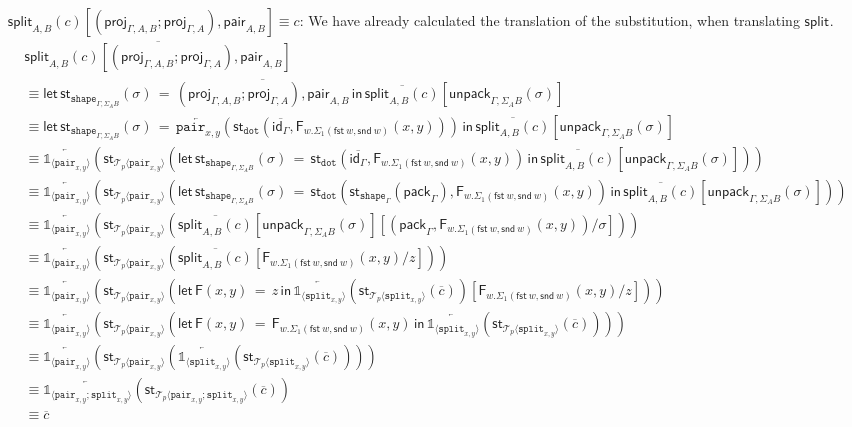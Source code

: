 \documentclass[10pt]{article}
\theoremstyle{definition}
\newcommand\dsd[1]{\ensuremath{\mathsf{#1}}}
\newcommand{\app}[2]{\ensuremath{#1 \: #2}}
\newcommand{\fst}[1]{\app{\dsd{fst}}{#1}}
\newcommand{\snd}[1]{\app{\dsd{snd}}{#1}}
\newcommand{\id}{\mathsf{id}}
\newcommand{\rewrite}[2]{\overleftarrow{#1}(#2)}
\newcommand\StI[2]{\ensuremath{\mathsf{st}_{#1}(#2)}}
\newcommand\StE[4]{\ensuremath{\mathsf{let} \, \StI{#1}{#3} \, = \, {#2} \, \mathsf{in} \, #4}}
\newcommand\FE[3]{\ensuremath{\mathsf{let} \, \mathsf{F}(#2) \, = \, {#1} \, \mathsf{in} \, #3}}
\newcommand\FIs[2]{\ensuremath{\mathsf{F}_{#1}{(#2)}}}
\newcommand\ApEl[2]{\mathcal{T}_{#1}\langle#2\rangle}
\newcommand\pack[1]{\ensuremath{\mathsf{pack}_{#1}}}
\newcommand\unpack[2]{\ensuremath{\mathsf{unpack}_{#1}(#2)}}
\newcommand{\tdot}{\ensuremath{\mathtt{dot}}}
\newcommand{\tshape}[1]{\ensuremath{\mathtt{shape}_{#1}}}
\newcommand{\upstairs}[1]{\overline{#1}}
\newcommand\proj[1]{\ensuremath{\mathsf{proj}_{#1}}}
\newcommand\One{\ensuremath{\mathds{1}}}
\newcommand\ApOne[1]{\ensuremath{\One_{\langle {#1} \rangle }}}
\newcommand\pair[1]{\ensuremath{\mathtt{pair}_{#1}}}
\newcommand\tsplit[1]{\ensuremath{\mathtt{split}_{#1}}}
\newcommand\qpair[1]{\ensuremath{\mathsf{pair}_{#1}}}
\newcommand\qsplit[1]{\ensuremath{\mathsf{split}_{#1}}}
\begin{document}
\begin{enumerate}[style = multiline, labelwidth = 80pt]
\item[{$\qsplit{A,B}(c)\allowbreak[(\proj{\Gamma, A, B};\proj{\Gamma, A}), \allowbreak\qpair{A,B}] \equiv c$}:] 
We have already calculated the translation of the substitution, when translating $\qsplit{}$.
\begin{align*}
&\upstairs{\qsplit{A,B}(c)[(\proj{\Gamma, A, B};\proj{\Gamma, A}), \qpair{A,B}]} \\
&\equiv \StE{\tshape{\Gamma, \Sigma_A B}}{\upstairs{(\proj{\Gamma, A, B};\proj{\Gamma, A}), \qpair{A,B}}}{\sigma}{\upstairs{\qsplit{A,B}(c)}[\unpack{\Gamma, \Sigma_A B}{\sigma}]} \\
&\equiv \StE{\tshape{\Gamma, \Sigma_A B}}{\rewrite{\pair{x,y}}{\StI{\tdot}{\upstairs{\id_\Gamma},\FIs{w. \Sigma_1(\fst w, \snd w)}{x,y}}}}{\sigma}{\upstairs{\qsplit{A,B}(c)}[\unpack{\Gamma, \Sigma_A B}{\sigma}]} \\
&\equiv \rewrite{\ApOne{\pair{x,y}}}{\StI{\ApEl{p}{\pair{x,y}}}{\StE{\tshape{\Gamma, \Sigma_A B}}{\StI{\tdot}{\upstairs{\id_\Gamma},\FIs{w. \Sigma_1(\fst w, \snd w)}{x,y}}}{\sigma}{\upstairs{\qsplit{A,B}(c)}[\unpack{\Gamma, \Sigma_A B}{\sigma}]}}} \\
&\equiv \rewrite{\ApOne{\pair{x,y}}}{\StI{\ApEl{p}{\pair{x,y}}}{\StE{\tshape{\Gamma, \Sigma_A B}}{\StI{\tdot}{\StI{\tshape{\Gamma}}{\pack{\Gamma}},\FIs{w. \Sigma_1(\fst w, \snd w)}{x,y}}}{\sigma}{\upstairs{\qsplit{A,B}(c)}[\unpack{\Gamma, \Sigma_A B}{\sigma}]}}} \\
&\equiv \rewrite{\ApOne{\pair{x,y}}}{\StI{\ApEl{p}{\pair{x,y}}}{\upstairs{\qsplit{A,B}(c)}[\unpack{\Gamma, \Sigma_A B}{\sigma}][(\pack{\Gamma},\FIs{w. \Sigma_1(\fst w, \snd w)}{x,y})/\sigma]}} \\
&\equiv \rewrite{\ApOne{\pair{x,y}}}{\StI{\ApEl{p}{\pair{x,y}}}{\upstairs{\qsplit{A,B}(c)}[\FIs{w. \Sigma_1(\fst w, \snd w)}{x,y}/z]}} \\
&\equiv \rewrite{\ApOne{\pair{x,y}}}{\StI{\ApEl{p}{\pair{x,y}}}{\FE{z}{x,y}{\rewrite{\ApOne{\tsplit{x,y}}}{\StI{\ApEl{p}{\tsplit{x,y}}}{\upstairs{c}}}}[\FIs{w. \Sigma_1(\fst w, \snd w)}{x,y}/z]}} \\
&\equiv \rewrite{\ApOne{\pair{x,y}}}{\StI{\ApEl{p}{\pair{x,y}}}{\FE{\FIs{w. \Sigma_1(\fst w, \snd w)}{x,y}}{x,y}{\rewrite{\ApOne{\tsplit{x,y}}}{\StI{\ApEl{p}{\tsplit{x,y}}}{\upstairs{c}}}}}} \\
&\equiv \rewrite{\ApOne{\pair{x,y}}}{\StI{\ApEl{p}{\pair{x,y}}}{\rewrite{\ApOne{\tsplit{x,y}}}{\StI{\ApEl{p}{\tsplit{x,y}}}{\upstairs{c}}}}} \\
&\equiv \rewrite{\ApOne{\pair{x,y};\tsplit{x,y}}}{\StI{\ApEl{p}{\pair{x,y};\tsplit{x,y}}}{\upstairs{c}}} \\
&\equiv \upstairs{c}
\end{align*}
\end{enumerate}
\end{document}
